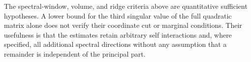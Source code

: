 The spectral-window, volume, and ridge criteria above are
quantitative sufficient hypotheses.  A lower bound for the third
singular value of the full quadratic matrix alone does not verify
their coordinate cut or marginal conditions.  Their usefulness is
that the estimates retain arbitrary self interactions and, where
specified, all additional spectral directions without any assumption
that a remainder is independent of the principal part.
